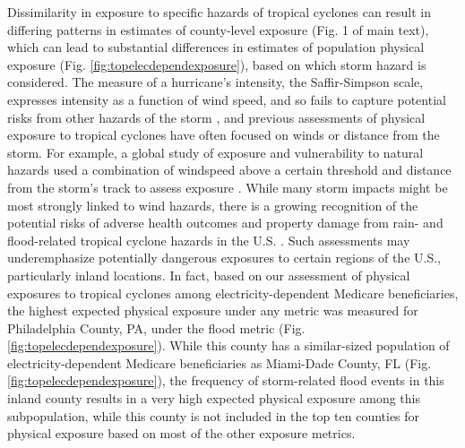 \documentclass[11pt, titlepage]{article}
\begin{document}
Dissimilarity in exposure to specific hazards of tropical cyclones can result in differing patterns in estimates of county-level exposure (Fig. 1 of main text), which can lead to substantial differences in estimates of population physical exposure (Fig. \ref{fig:topelecdependexposure}), based on which storm hazard is considered. The measure of a hurricane's intensity, the Saffir-Simpson scale, expresses intensity as a function of wind speed, and so fails to capture potential risks from other hazards of the storm \citep{smith2009}, and previous assessments of physical exposure to tropical cyclones have often focused on winds or distance from the storm. For example, a global study of exposure and vulnerability to natural hazards used a combination of windspeed above a certain threshold and distance from the storm's track to assess exposure \citep{peduzzi2009assessing}. While many storm impacts might be most strongly linked to wind hazards, there is a growing recognition of the potential risks of adverse health outcomes and property damage from rain- and flood-related tropical cyclone hazards in the U.S. \citep{smith2009}. Such assessments may underemphasize potentially dangerous exposures to certain regions of the U.S., particularly inland locations. In fact, based on our assessment of physical exposures to tropical cyclones among electricity-dependent Medicare beneficiaries, the highest expected physical exposure under any metric was measured for Philadelphia County, PA, under the flood metric (Fig. \ref{fig:topelecdependexposure}). While this county has a similar-sized population of electricity-dependent Medicare beneficiaries as Miami-Dade County, FL (Fig. \ref{fig:topelecdependexposure}), the frequency of storm-related flood events in this inland county results in a very high expected physical exposure among this subpopulation, while this county is not included in the top ten counties for physical exposure based on most of the other exposure metrics.

\clearpage
\end{document}
